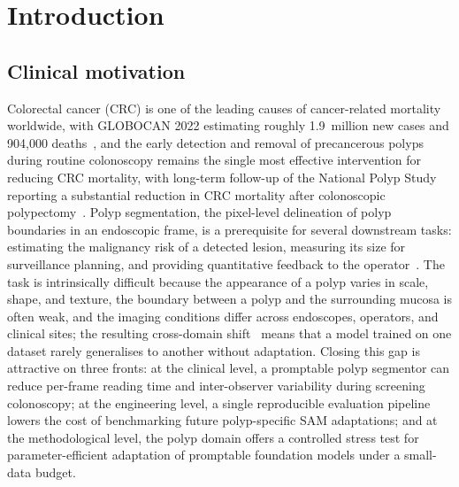 
\chapter{Introduction}
\label{chap:intro}
\setcounter{section}{0}

\section{Clinical motivation}
\label{sec:motivation}

Colorectal cancer (CRC) is one of the leading causes of cancer-related mortality worldwide, with GLOBOCAN 2022 estimating roughly 1.9~million new cases and 904,000 deaths~\cite{bray2024globocan}, and the early detection and removal of precancerous polyps during routine colonoscopy remains the single most effective intervention for reducing CRC mortality, with long-term follow-up of the National Polyp Study reporting a substantial reduction in CRC mortality after colonoscopic polypectomy~\cite{zauber2012nejm}. Polyp segmentation, the pixel-level delineation of polyp boundaries in an endoscopic frame, is a prerequisite for several downstream tasks: estimating the malignancy risk of a detected lesion, measuring its size for surveillance planning, and providing quantitative feedback to the operator~\cite{tudela2024frontiers}. The task is intrinsically difficult because the appearance of a polyp varies in scale, shape, and texture, the boundary between a polyp and the surrounding mucosa is often weak, and the imaging conditions differ across endoscopes, operators, and clinical sites; the resulting cross-domain shift~\cite{guan2022tbme} means that a model trained on one dataset rarely generalises to another without adaptation. Closing this gap is attractive on three fronts: at the clinical level, a promptable polyp segmentor can reduce per-frame reading time and inter-observer variability during screening colonoscopy; at the engineering level, a single reproducible evaluation pipeline lowers the cost of benchmarking future polyp-specific SAM adaptations; and at the methodological level, the polyp domain offers a controlled stress test for parameter-efficient adaptation of promptable foundation models under a small-data budget.

